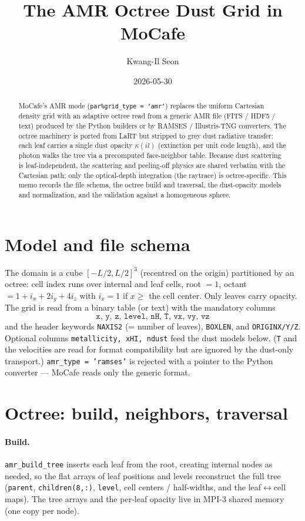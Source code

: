 \documentclass[english,a4paper]{kiseon_memo}
\begin{document}
\title{The AMR Octree Dust Grid in MoCafe}
\author{Kwang-Il Seon}
\date{2026-05-30}
\maketitle

\begin{abstract}
MoCafe's AMR mode (\texttt{par\%grid\_type = 'amr'}) replaces the uniform
Cartesian density grid with an adaptive octree read from a generic AMR file
(FITS / HDF5 / text) produced by the Python builders or by RAMSES /
Illustris-TNG converters.  The octree machinery is ported from LaRT but
stripped to grey dust radiative transfer: each leaf carries a single dust
opacity $\kappa(il)$ (extinction per unit code length), and the photon walks
the tree via a precomputed face-neighbor table.  Because dust scattering is
leaf-independent, the scattering and peeling-off physics are shared verbatim
with the Cartesian path; only the optical-depth integration (the raytrace)
is octree-specific.  This memo records the file schema, the octree build and
traversal, the dust-opacity models and normalization, and the validation
against a homogeneous sphere.
\end{abstract}

\section{Model and file schema}
The domain is a cube $[-L/2,L/2]^3$ (recentred on the origin) partitioned by
an octree: cell index runs over internal and leaf cells, root $=1$, octant
$=1+i_x+2i_y+4i_z$ with $i_x=1$ if $x\ge$ the cell center.  Only leaves carry
opacity.  The grid is read from a binary table (or text) with the mandatory
columns
\[
  \texttt{x, y, z, level, nH, T, vx, vy, vz}
\]
and the header keywords \texttt{NAXIS2} (= number of leaves), \texttt{BOXLEN},
and \texttt{ORIGINX/Y/Z}.  Optional columns \texttt{metallicity, xHI, ndust}
feed the dust models below.  (\texttt{T} and the velocities are read for
format compatibility but are ignored by the dust-only transport.)
\texttt{amr\_type = 'ramses'} is rejected with a pointer to the Python
converter --- MoCafe reads only the generic format.

\section{Octree: build, neighbors, traversal}
\paragraph{Build.}
\texttt{amr\_build\_tree} inserts each leaf from the root, creating internal
nodes as needed, so the flat arrays of leaf positions and levels reconstruct
the full tree (\texttt{parent}, \texttt{children(8,:)}, \texttt{level},
cell centers / half-widths, and the leaf$\leftrightarrow$cell maps).  The tree
arrays and the per-leaf opacity live in MPI-3 shared memory (one copy per
node).
\end{document}
